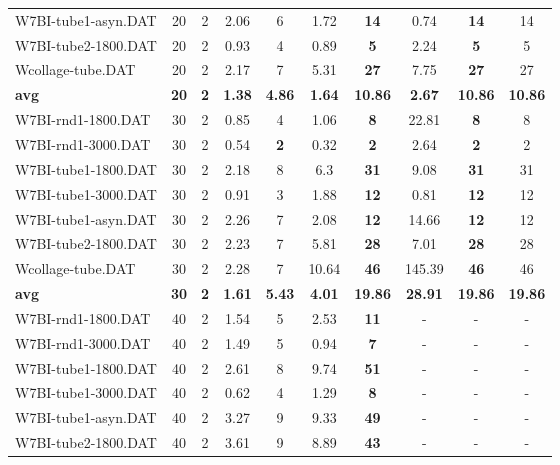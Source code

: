 \begin{table}[h]
\begin{tabular}{lccccccccc}
W7BI-tube1-asyn.DAT & 20 & 2 & 2.06 & 6 & 1.72 &  \textbf{14} &  \textcolor{blue2}{0.74} &  \textbf{14}  & 14 \\
W7BI-tube2-1800.DAT & 20 & 2 & 0.93 & 4 &  \textcolor{blue2}{0.89} &  \textbf{5} & 2.24 &  \textbf{5}  & 5 \\
Wcollage-tube.DAT & 20 & 2 &  \textcolor{blue2}{2.17} & 7 & 5.31 &  \textbf{27} & 7.75 &  \textbf{27}  & 27 \\
\cline{1-10} \textbf{avg} & \textbf{20} & \textbf{2} & \textbf{1.38} & \textbf{4.86} & \textbf{1.64} & \textbf{10.86} & \textbf{2.67} & \textbf{10.86} & \textbf{10.86} \\ \cline{1-10}
W7BI-rnd1-1800.DAT & 30 & 2 &  \textcolor{blue2}{0.85} & 4 & 1.06 &  \textbf{8} & 22.81 &  \textbf{8}  & 8 \\
W7BI-rnd1-3000.DAT & 30 & 2 & 0.54 &  \textbf{2} &  \textcolor{blue2}{0.32} &  \textbf{2} & 2.64 &  \textbf{2}  & 2 \\
W7BI-tube1-1800.DAT & 30 & 2 &  \textcolor{blue2}{2.18} & 8 & 6.3 &  \textbf{31} & 9.08 &  \textbf{31}  & 31 \\
W7BI-tube1-3000.DAT & 30 & 2 & 0.91 & 3 & 1.88 &  \textbf{12} &  \textcolor{blue2}{0.81} &  \textbf{12}  & 12 \\
W7BI-tube1-asyn.DAT & 30 & 2 & 2.26 & 7 &  \textcolor{blue2}{2.08} &  \textbf{12} & 14.66 &  \textbf{12}  & 12 \\
W7BI-tube2-1800.DAT & 30 & 2 &  \textcolor{blue2}{2.23} & 7 & 5.81 &  \textbf{28} & 7.01 &  \textbf{28}  & 28 \\
Wcollage-tube.DAT & 30 & 2 &  \textcolor{blue2}{2.28} & 7 & 10.64 &  \textbf{46} & 145.39 &  \textbf{46}  & 46 \\
\cline{1-10} \textbf{avg} & \textbf{30} & \textbf{2} & \textbf{1.61} & \textbf{5.43} & \textbf{4.01} & \textbf{19.86} & \textbf{28.91} & \textbf{19.86} & \textbf{19.86} \\ \cline{1-10}
W7BI-rnd1-1800.DAT & 40 & 2 & 1.54 & 5 & 2.53 &  \textbf{11} &  - &  -  & - \\
W7BI-rnd1-3000.DAT & 40 & 2 & 1.49 & 5 & 0.94 &  \textbf{7} &  - &  -  & - \\
W7BI-tube1-1800.DAT & 40 & 2 & 2.61 & 8 & 9.74 &  \textbf{51} &  - &  -  & - \\
W7BI-tube1-3000.DAT & 40 & 2 & 0.62 & 4 & 1.29 &  \textbf{8} &  - &  -  & - \\
W7BI-tube1-asyn.DAT & 40 & 2 & 3.27 & 9 & 9.33 &  \textbf{49} &  - &  -  & - \\
W7BI-tube2-1800.DAT & 40 & 2 & 3.61 & 9 & 8.89 &  \textbf{43} &  - &  -  & - \\

\end{tabular}
\end{table}
